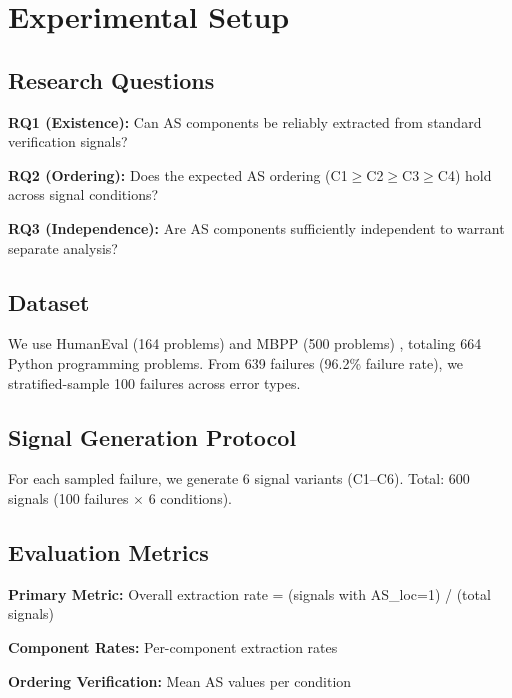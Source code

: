 \section{Experimental Setup}

\subsection{Research Questions}

\textbf{RQ1 (Existence):} Can AS components be reliably extracted from standard verification signals?

\textbf{RQ2 (Ordering):} Does the expected AS ordering (C1$\geq$C2$\geq$C3$\geq$C4) hold across signal conditions?

\textbf{RQ3 (Independence):} Are AS components sufficiently independent to warrant separate analysis?

\subsection{Dataset}

We use HumanEval (164 problems) \citep{humaneval2021} and MBPP (500 problems) \citep{mbpp2021}, totaling 664 Python programming problems. From 639 failures (96.2\% failure rate), we stratified-sample 100 failures across error types.

\subsection{Signal Generation Protocol}

For each sampled failure, we generate 6 signal variants (C1--C6). Total: 600 signals (100 failures $\times$ 6 conditions).

\subsection{Evaluation Metrics}

\textbf{Primary Metric:} Overall extraction rate = (signals with AS\_loc=1) / (total signals)

\textbf{Component Rates:} Per-component extraction rates

\textbf{Ordering Verification:} Mean AS values per condition
